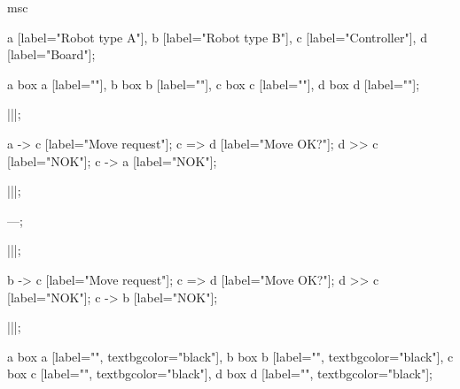\begin{msc}
msc
{

a [label="Robot type A"],
b [label="Robot type B"],
c [label="Controller"],
d [label="Board"];

a box a [label=""],
b box b [label=""],
c box c [label=""],
d box d [label=""];

|||;

a -> c [label="Move request"];
c => d [label="Move OK?"];
d >> c [label="NOK"];
c -> a [label="NOK"];

|||;

---;

|||;

b -> c [label="Move request"];
c => d [label="Move OK?"];
d >> c [label="NOK"];
c -> b [label="NOK"];

|||;

a box a [label="", textbgcolor="black"],
b box b [label="", textbgcolor="black"],
c box c [label="", textbgcolor="black"],
d box d [label="", textbgcolor="black"];

}
\end{msc}
